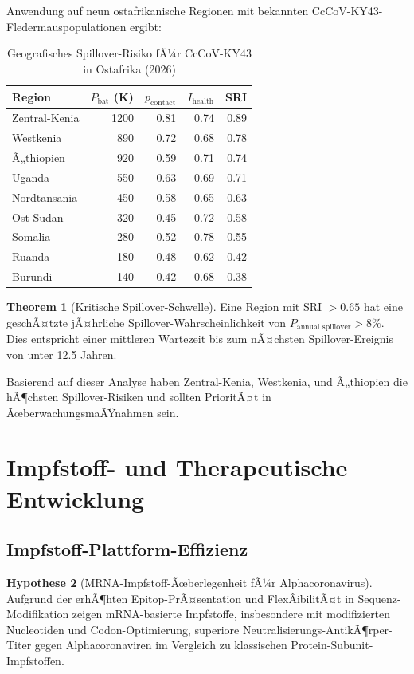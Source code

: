 ﻿\documentclass[11pt,a4paper]{article}
\theoremstyle{definition}
\newtheorem{theorem}{Theorem}[section]
\newtheorem{hypothesis}[theorem]{Hypothese}
\begin{document}
Anwendung auf neun ostafrikanische Regionen mit bekannten CcCoV-KY43-Fledermauspopu\-lationen ergibt:

\begin{table}[H]
\centering
\begin{tabular}{lrrrr}
\toprule
Region & $P_{\text{bat}}$ (K) & $p_{\text{contact}}$ & $I_{\text{health}}$ & SRI \\
\midrule
Zentral-Kenia & 1200 & 0.81 & 0.74 & 0.89 \\
Westkenia & 890 & 0.72 & 0.68 & 0.78 \\
Ã„thiopien & 920 & 0.59 & 0.71 & 0.74 \\
Uganda & 550 & 0.63 & 0.69 & 0.71 \\
Nordtansania & 450 & 0.58 & 0.65 & 0.63 \\
Ost-Sudan & 320 & 0.45 & 0.72 & 0.58 \\
Somalia & 280 & 0.52 & 0.78 & 0.55 \\
Ruanda & 180 & 0.48 & 0.62 & 0.42 \\
Burundi & 140 & 0.42 & 0.68 & 0.38 \\
\bottomrule
\end{tabular}
\caption{Geografisches Spillover-Risiko fÃ¼r CcCoV-KY43 in Ostafrika (2026)}
\end{table}

\begin{theorem}[Kritische Spillover-Schwelle]
Eine Region mit SRI $> 0.65$ hat eine geschÃ¤tzte jÃ¤hrliche Spillover-Wahrscheinlichkeit von $P_{\text{annual spillover}} > 8\%$. Dies entspricht einer mittleren Wartezeit bis zum nÃ¤chsten Spillover-Ereignis von unter 12.5 Jahren.
\end{theorem}

Basierend auf dieser Analyse haben Zentral-Kenia, Westkenia, und Ã„thiopien die hÃ¶chsten Spillover-Risiken und sollten PrioritÃ¤t in ÃœberwachungsmaÃŸnahmen sein.

\section{Impfstoff- und Therapeutische Entwicklung}

\subsection{Impfstoff-Plattform-Effizienz}

\begin{hypothesis}[MRNA-Impfstoff-Ãœberlegenheit fÃ¼r Alphacoronavirus]
Aufgrund der erhÃ¶hten Epitop-PrÃ¤sentation und FlexÂ­ibilitÃ¤t in Sequenz-Modifikation zeigen mRNA-basierte Impfstoffe, insbesondere mit modifizierten Nucleotiden und Codon-Optimierung, superiore Neutralisierungs-AntikÃ¶rper-Titer gegen Alphacoronaviren im Vergleich zu klassischen Protein-Subunit-Impfstoffen.
\end{hypothesis}
\end{document}

